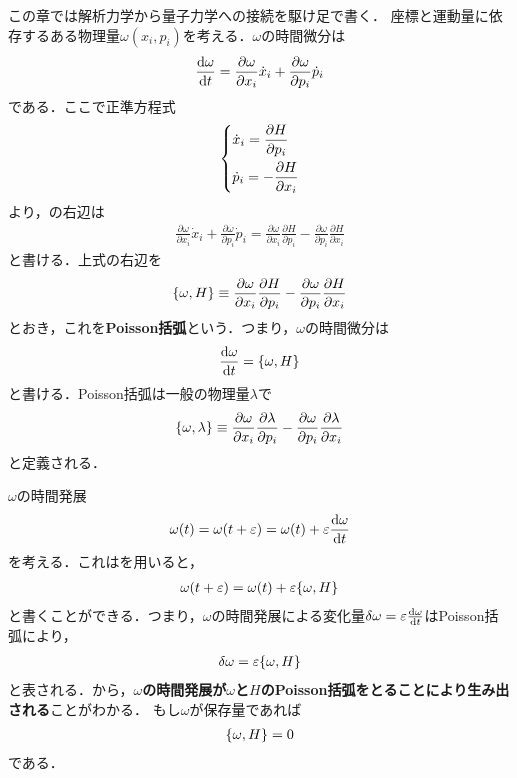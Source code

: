 \documentclass{report}
\begin{document}
  この章では解析力学から量子力学への接続を駆け足で書く．
  座標と運動量に依存するある物理量$\omega(x_i,p_i)$を考える．$\omega$の時間微分は
  \begin{align}
    \dv{\omega}{t} = \frac{\partial\omega}{\partial x_i}\dot{x}_i + \frac{\partial \omega}{\partial p_i}\dot{p}_i \label{time-derivative-omega}
  \end{align}
  である．ここで正準方程式
  \begin{align}
    \begin{dcases}
      \dot{x}_i = \frac{\partial H}{\partial p_i}\\
      \dot{p}_i = -\frac{\partial H}{\partial x_i}
    \end{dcases}
  \end{align}
  より，の右辺は
  \begin{align}
    \frac{\partial\omega}{\partial x_i}\dot{x}_i + \frac{\partial \omega}{\partial p_i}\dot{p}_i
    =
    \frac{\partial\omega}{\partial x_i}\frac{\partial H}{\partial p_i} - \frac{\partial \omega}{\partial p_i}\frac{\partial H}{\partial x_i}
  \end{align}
  と書ける．上式の右辺を
  \begin{align}
    \qty{\omega,H} \equiv   \frac{\partial\omega}{\partial x_i}\frac{\partial H}{\partial p_i} - \frac{\partial \omega}{\partial p_i}\frac{\partial H}{\partial x_i}
  \end{align}
  とおき，これを\textbf{Poisson括弧}という．つまり，$\omega$の時間微分は
  \begin{align}
    \dv{\omega}{t} = \qty{\omega,H} \label{poisson-h}
  \end{align}
  と書ける．Poisson括弧は一般の物理量$\lambda$で
  \begin{align}
    \qty{\omega,\lambda} \equiv   \frac{\partial\omega}{\partial x_i}\frac{\partial \lambda}{\partial p_i} - \frac{\partial \omega}{\partial p_i}\frac{\partial \lambda}{\partial x_i}
  \end{align}
  と定義される．

  $\omega$の時間発展
  \begin{align}
    \omega(t) = \omega(t+\varepsilon) = \omega(t) + \varepsilon\dv{\omega}{t}
  \end{align}
  を考える．これはを用いると，
  \begin{align}
    \omega(t+\varepsilon) = \omega(t) + \varepsilon\qty{\omega,H}
  \end{align}
  と書くことができる．つまり，$\omega$の時間発展による変化量$\delta\omega=\varepsilon\dv{\omega}{t}$はPoisson括弧により，
  \begin{align}
    \delta\omega = \varepsilon\qty{\omega,H} \label{time-evolution-by-poisson}
  \end{align}
  と表される．から，\textbf{$\omega$の時間発展が$\omega$と$H$のPoisson括弧をとることにより生み出される}ことがわかる．
  もし$\omega$が保存量であれば
  \begin{align}
    \qty{\omega,H}=0
  \end{align}
  である．
\end{document}
